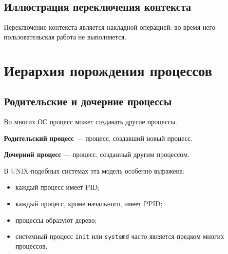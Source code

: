 \documentclass[12pt,a4paper]{article}
\begin{document}
\subsection{Иллюстрация переключения контекста}

\begin{center}
\end{center}

Переключение контекста является накладной операцией: во время него пользовательская работа не выполняется.

\section{Иерархия порождения процессов}

\subsection{Родительские и дочерние процессы}

Во многих ОС процесс может создавать другие процессы.

\textbf{Родительский процесс} --- процесс, создавший новый процесс.

\textbf{Дочерний процесс} --- процесс, созданный другим процессом.

В UNIX-подобных системах эта модель особенно выражена:
\begin{itemize}
    \item каждый процесс имеет PID;
    \item каждый процесс, кроме начального, имеет PPID;
    \item процессы образуют дерево;
    \item системный процесс \texttt{init} или \texttt{systemd} часто является предком многих процессов.
\end{itemize}
\end{document}
